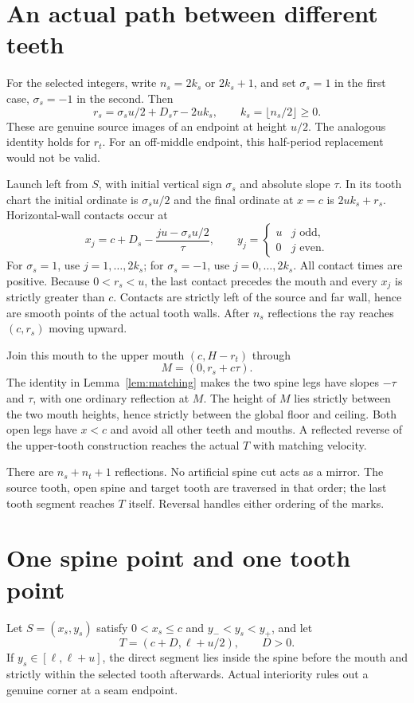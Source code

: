 \documentclass[11pt]{article}
\theoremstyle{definition}
\begin{document}
\section{An actual path between different teeth}
For the selected integers, write $n_s=2k_s$ or $2k_s+1$, and set $\sigma_s=1$ in the first case, $\sigma_s=-1$ in the second. Then
\[
 r_s=\sigma_s u/2+D_s\tau-2uk_s,\qquad k_s=\lfloor n_s/2\rfloor\ge0.
\]
These are genuine source images of an endpoint at height $u/2$. The analogous identity holds for $r_t$. For an off-middle endpoint, this half-period replacement would not be valid.

Launch left from $S$, with initial vertical sign $\sigma_s$ and absolute slope $\tau$. In its tooth chart the initial ordinate is $\sigma_su/2$ and the final ordinate at $x=c$ is $2uk_s+r_s$. Horizontal-wall contacts occur at
\[
 x_j=c+D_s-\frac{ju-\sigma_su/2}{\tau},
 \qquad y_j=\begin{cases}u&j\text{ odd},\\0&j\text{ even}.\end{cases}
\]
For $\sigma_s=1$, use $j=1,\ldots,2k_s$; for $\sigma_s=-1$, use $j=0,\ldots,2k_s$. All contact times are positive. Because $0<r_s<u$, the last contact precedes the mouth and every $x_j$ is strictly greater than $c$. Contacts are strictly left of the source and far wall, hence are smooth points of the actual tooth walls. After $n_s$ reflections the ray reaches $(c,r_s)$ moving upward.

Join this mouth to the upper mouth $(c,H-r_t)$ through
\[
 M=(0,r_s+c\tau).
\]
The identity in Lemma~\ref{lem:matching} makes the two spine legs have slopes $-\tau$ and $\tau$, with one ordinary reflection at $M$. The height of $M$ lies strictly between the two mouth heights, hence strictly between the global floor and ceiling. Both open legs have $x<c$ and avoid all other teeth and mouths. A reflected reverse of the upper-tooth construction reaches the actual $T$ with matching velocity.

There are $n_s+n_t+1$ reflections. No artificial spine cut acts as a mirror. The source tooth, open spine and target tooth are traversed in that order; the last tooth segment reaches $T$ itself. Reversal handles either ordering of the marks.

\section{One spine point and one tooth point}
Let $S=(x_s,y_s)$ satisfy $0<x_s\le c$ and $y_-<y_s<y_+$, and let
\[
 T=(c+D,\ell+u/2),\qquad D>0.
\]
If $y_s\in[\ell,\ell+u]$, the direct segment lies inside the spine before the mouth and strictly within the selected tooth afterwards. Actual interiority rules out a genuine corner at a seam endpoint.
\end{document}
